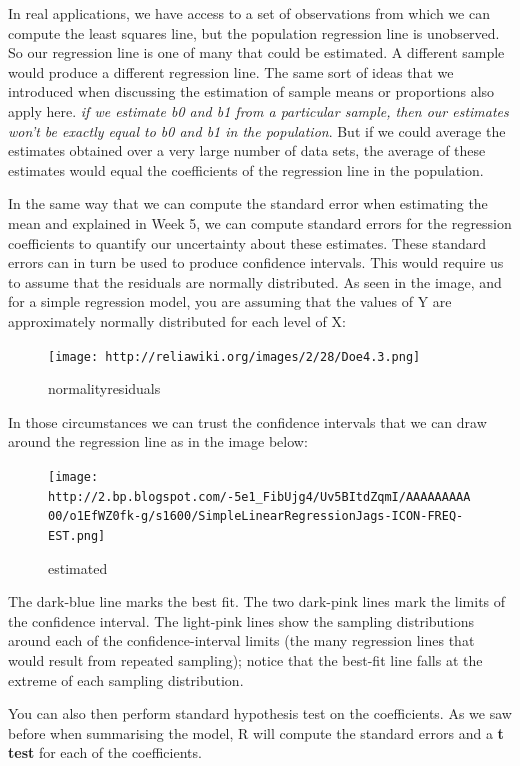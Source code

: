 \documentclass[
]{book}
\begin{document}
In real applications, we have access to a set of observations from which we can compute the least squares line, but the population regression line is unobserved. So our regression line is one of many that could be estimated. A different sample would produce a different regression line. The same sort of ideas that we introduced when discussing the estimation of sample means or proportions also apply here. \emph{if we estimate b0 and b1 from a particular sample, then our estimates won't be exactly equal to b0 and b1 in the population}. But if we could average the estimates obtained over a very large number of data sets, the average of these estimates would equal the coefficients of the regression line in the population.

In the same way that we can compute the standard error when estimating the mean and explained in Week 5, we can compute standard errors for the regression coefficients to quantify our uncertainty about these estimates. These standard errors can in turn be used to produce confidence intervals. This would require us to assume that the residuals are normally distributed. As seen in the image, and for a simple regression model, you are assuming that the values of Y are approximately normally distributed for each level of X:

\begin{figure}
\centering
\texttt{[image: http://reliawiki.org/images/2/28/Doe4.3.png]}
\caption{normalityresiduals}
\end{figure}

In those circumstances we can trust the confidence intervals that we can draw around the regression line as in the image below:

\begin{figure}
\centering
\texttt{[image: http://2.bp.blogspot.com/-5e1\_FibUjg4/Uv5BItdZqmI/AAAAAAAAA00/o1EfWZ0fk-g/s1600/SimpleLinearRegressionJags-ICON-FREQ-EST.png]}
\caption{estimated}
\end{figure}

The dark-blue line marks the best fit. The two dark-pink lines mark the limits of the confidence interval. The light-pink lines show the sampling distributions around each of the confidence-interval limits (the many regression lines that would result from repeated sampling); notice that the best-fit line falls at the extreme of each sampling distribution.

You can also then perform standard hypothesis test on the coefficients. As we saw before when summarising the model, R will compute the standard errors and a \textbf{t test} for each of the coefficients.
\end{document}
